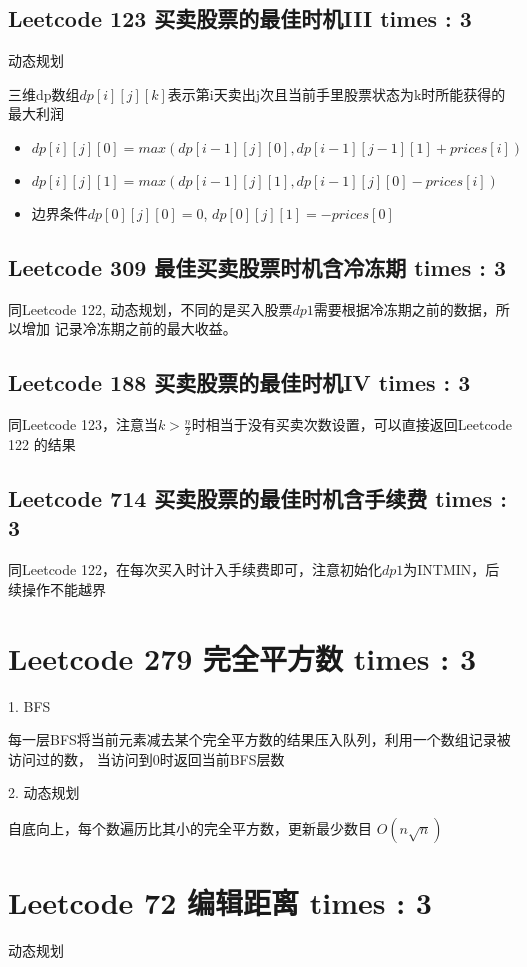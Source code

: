 \documentclass[UTF8]{ctexart}
\begin{document}
\subsection{Leetcode 123 买卖股票的最佳时机III times : 3}
动态规划

三维dp数组$dp[i][j][k]$表示第i天卖出j次且当前手里股票状态为k时所能获得的最大利润
\begin{itemize}
	\item $dp[i][j][0] = max(dp[i - 1][j][0], dp[i - 1][j - 1][1] + prices[i])$
	\item $dp[i][j][1] = max(dp[i - 1][j][1], dp[i - 1][j][0] - prices[i])$
	\item 边界条件$dp[0][j][0] = 0$, $dp[0][j][1] = -prices[0]$
\end{itemize}

\subsection{Leetcode 309 最佳买卖股票时机含冷冻期 times : 3}
同Leetcode 122, 动态规划，不同的是买入股票$dp1$需要根据冷冻期之前的数据，所以增加
记录冷冻期之前的最大收益。

\subsection{Leetcode 188 买卖股票的最佳时机IV times : 3}
同Leetcode 123，注意当$k > \frac{n}{2}$时相当于没有买卖次数设置，可以直接返回Leetcode 122
的结果

\subsection{Leetcode 714 买卖股票的最佳时机含手续费 times : 3}
同Leetcode 122，在每次买入时计入手续费即可，注意初始化$dp1$为INTMIN，后续操作不能越界

\section{Leetcode 279 完全平方数 times : 3}
1. BFS

每一层BFS将当前元素减去某个完全平方数的结果压入队列，利用一个数组记录被访问过的数，
当访问到0时返回当前BFS层数

2. 动态规划

自底向上，每个数遍历比其小的完全平方数，更新最少数目 $O(n\sqrt{n})$

\section{Leetcode 72 编辑距离 times : 3}
动态规划
\end{document}
